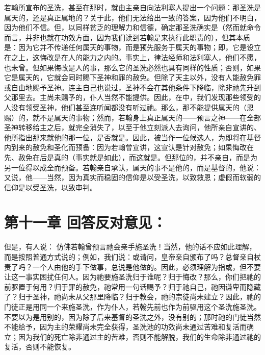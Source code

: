 若翰所宣布的圣洗，甚至在那时，就由主亲自向法利塞人提出一个问题：那圣洗是属天的，还是真正属地的？关于此，他们无法给出一致的答案，因为他们不明白，因为他们不信。但，以同样贫乏的理解力和信德，确定那圣洗确实是（然而就命令而言，并非也就在功效方面，因为我们读到若翰是来执行此职责的），但其本质是：因为它并不传递任何属天的事物，而是预先服务于属天的事物；即，它是设立在之上，这悔改是在人的能力之内的。事实上，律法经师和法利塞人，他们不愿，也未曾。但如果悔改是人的事，那么它的圣洗必然也具有同样的性质；否则，如果它是属天的，它就会同时赐下圣神和罪的赦免。但除了天主以外，没有人能赦免罪或自由地赐予圣神。连主自己也说过，圣神不会在其他条件下降临，除非祂先升到父那里去。主尚未赐予的，仆人当然不能提供。因此，在中，我们发现那些领受的人没有领受圣神，他们甚至连听闻都没有听过祂。那么，那不能提供属天的（恩赐）的，就不是属天的事物；然而，若翰身上真正属天的——预言之神——在全部圣神转移给主之后，就完全消失了，以至于他立刻派人去询问，他所亲自宣讲的、他所指出那来就他的那一位，是否就是。因此，被当作一位候选人，为即将在基督内到来的赦免和圣化而预备：因为若翰曾宣讲，这宣认是针对赦免；如果悔改在先、赦免在后是真的（事实就是如此），而这就是。但那位的，并不亲自，而是为另一位得以成全而预备。若翰亲自承认，属天的事不是他的，而是基督的，他说：又说，他——当然，因为真实而稳固的信仰是以受圣洗，以致救恩；虚假而软弱的信仰是以受圣洗，以致审判。\par


\section{第十一章 回答反对意见：}

但是，有人说： 仿佛若翰曾预言祂会亲手施圣洗！当然，他的话不应如此理解，而是按照普通方式说的；例如，我们说：或请问，皇帝亲自颁布了吗？总督亲自杖责了吗？一个人由他的手下做事，总说是他做的。因此，必须理解为指或，但不要让这一事实困扰任何人。因为祂要施圣洗归于谁呢？归于悔改？那么，你们把祂的前驱置于何用？归于罪的赦免，祂常用一句话赐予？归于祂自己，祂因谦卑而隐藏了？归于圣神，祂尚未从父那里降临？归于教会，祂的宗徒尚未建立？因此，祂的门徒正是用同一个来施圣洗，作为仆人，若翰先前也作为前驱用这个圣洗施圣洗。不要以为是用别的，因为除了后来基督的圣洗之外，没有别的；那时祂的门徒当然不能给予，因为主的荣耀尚未完全获得，圣洗池的功效尚未通过苦难和复活而确立；因为我们的死亡除非通过主的苦难，否则不能解脱，我们的生命除非通过祂的复活，否则不能恢复。\par

